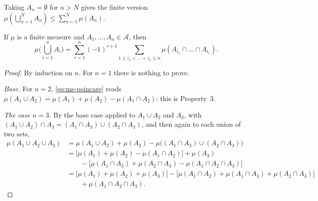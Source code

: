 Taking $A_n=\emptyset$ for $n>N$ gives the finite version
$\mu(\bigcup_{n=1}^NA_n)\le\sum_{n=1}^N\mu(A_n)$.

\begin{theorem}\label{thm:ms-inclusion-exclusion}
If $\mu$ is a finite measure and $A_1,\dots,A_n\in\mathcal A$, then
\begin{equation}\label{eq:ms-poincare}
  \mu\Big(\bigcup_{i=1}^nA_i\Big)=\sum_{r=1}^n(-1)^{r+1}\sum_{1\le i_1<\dots<i_r\le n}
  \mu(A_{i_1}\cap\dots\cap A_{i_r}).
\end{equation}
\end{theorem}

\begin{proof}
By induction on $n$. For $n=1$ there is nothing to prove.

\emph{Base.} For $n=2$, \eqref{eq:ms-poincare} reads
$\mu(A_1\cup A_2)=\mu(A_1)+\mu(A_2)-\mu(A_1\cap A_2)$: this is Property~3.

\emph{The case $n=3$.} By the base case applied to $A_1\cup A_2$ and $A_3$, with
$(A_1\cup A_2)\cap A_3=(A_1\cap A_3)\cup(A_2\cap A_3)$, and then again to each union of two sets,
\begin{align*}
  \mu(A_1\cup A_2\cup A_3)&=\mu(A_1\cup A_2)+\mu(A_3)-\mu\big((A_1\cap A_3)\cup(A_2\cap A_3)\big)\\
  &=\big[\mu(A_1)+\mu(A_2)-\mu(A_1\cap A_2)\big]+\mu(A_3)\\
  &\qquad-\big[\mu(A_1\cap A_3)+\mu(A_2\cap A_3)-\mu(A_1\cap A_2\cap A_3)\big]\\
  &=\big[\mu(A_1)+\mu(A_2)+\mu(A_3)\big]-\big[\mu(A_1\cap A_2)+\mu(A_1\cap A_3)+\mu(A_2\cap A_3)\big]\\
  &\qquad+\mu(A_1\cap A_2\cap A_3).
\end{align*}


\end{proof}
